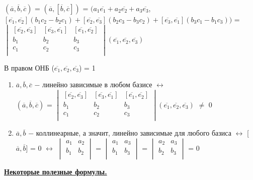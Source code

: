 \begin{center}
    $(\overline{a}, \overline{b}, \overline{c})$ = $(\overline{a}, [\overline{b}, \overline{c}])$ = $(a_1\overline{e_1} + a_2\overline{e_2} + a_3\overline{e_3}$, $[\overline{e_1}, \overline{e_2}](b_1 c_2 - b_2 c_1) + [\overline{e_2}, \overline{e_3}](b_2 c_3 - b_3 c_2) + [\overline{e_3}, \overline{e_1}](b_3 c_1 - b_1 c_3))$ = 
        $\begin{vmatrix}
            [\overline{e_2}, \overline{e_3}] & [\overline{e_3}, \overline{e_1}] & [\overline{e_1}, \overline{e_2}]\\
            b_1 & b_2 & b_3\\
            c_1 & c_2 & c_3\\
        \end{vmatrix}(\overline{e_1}, \overline{e_2}, \overline{e_3})$
\end{center}

В правом ОНБ ($\overline{e_1}, \overline{e_2}, \overline{e_3}$) = 1

\begin{enumerate}
    \item $\overline{a}, \overline{b}, \overline{c}$ $-$ линейно зависимые в любом базисе $\longleftrightarrow$ \\
    $(\overline{a}, \overline{b}, \overline{c})$ = 
    $\begin{vmatrix}
        [\overline{e_2}, \overline{e_3}] & [\overline{e_3}, \overline{e_1}] & [\overline{e_1}, \overline{e_2}]\\
        b_1 & b_2 & b_3\\
        c_1 & c_2 & c_3\\
    \end{vmatrix}(\overline{e_1}, \overline{e_2}, \overline{e_3})$ $\neq$ 0

    \item $\overline{a}, \overline{b}$ $-$ коллинеарные, а значит, линейно зависимые для любого базиса $\longleftrightarrow$ [$\overline{a}, \overline{b}$] = 0 $\longleftrightarrow$
    $\begin{vmatrix}
        a_1 & a_2\\
        b_1 & b_2\\
    \end{vmatrix}$ = 
    $\begin{vmatrix}
        a_1 & a_3\\
        b_1 & b_3\\
    \end{vmatrix}$ =
    $\begin{vmatrix}
        a_2 & a_3\\
        b_2 & b_3\\
    \end{vmatrix}$ = 0
\end{enumerate}
\underline{\textbf{Некоторые полезные формулы.}}

